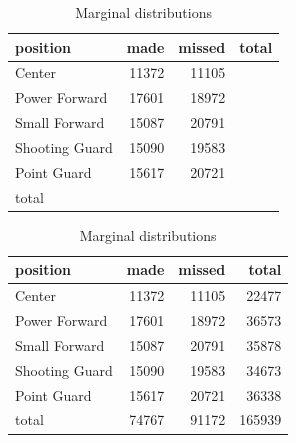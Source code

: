 \documentclass[letterpaper, landscape]{exam}
\begin{document}
\begin{questions}
      \ifprintanswers
      \else
        \begin{table}[H]
          \centering
          \begin{tabular}{lrrr}
            \toprule
            position       & made  & missed & total \\
            \midrule
            Center         & 11372 & 11105  &       \\
            Power Forward  & 17601 & 18972  &       \\
            Small Forward  & 15087 & 20791  &       \\
            Shooting Guard & 15090 & 19583  &       \\
            Point Guard    & 15617 & 20721  &       \\
            \midrule
            total          &       &        &        \\
            \bottomrule
          \end{tabular}
          \caption{Marginal distributions}
          \label{tab:marginal_shots}
        \end{table}
      \fi

      \begin{solution}
        
        \begin{table}[H]
          \centering
          \begin{tabular}{lrrr}
            \toprule
            position       & made  & missed & total \\
            \midrule
            Center         & 11372 & 11105  & 22477 \\
            Power Forward  & 17601 & 18972  & 36573 \\
            Small Forward  & 15087 & 20791  & 35878 \\
            Shooting Guard & 15090 & 19583 & 34673 \\
            Point Guard    & 15617 & 20721 & 36338 \\
            \midrule
            total          & 74767 & 91172 & 165939 \\
            \bottomrule
          \end{tabular}
          \caption{Marginal distributions}
          \label{tab:marginal_shots}
        \end{table}

      \end{solution}

      \question 
        \label{q:sbp.last}
        \begin{parts}

\end{parts}
\end{questions}
\end{document}
